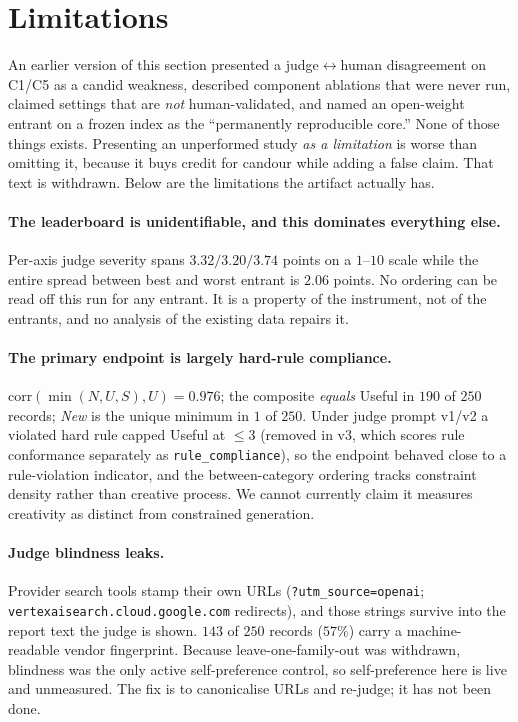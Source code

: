 \section{Limitations}
\label{sec:limitations}

An earlier version of this section presented a judge$\leftrightarrow$human disagreement on C1/C5 as a
candid weakness, described component ablations that were never run, claimed settings that are
\emph{not} human-validated, and named an open-weight entrant on a frozen index as the ``permanently
reproducible core.'' None of those things exists. Presenting an unperformed study \emph{as a limitation} is worse than omitting it, because it
buys credit for candour while adding a false claim. That text is withdrawn. Below are the limitations
the artifact actually has.

\paragraph{The leaderboard is unidentifiable, and this dominates everything else.} Per-axis judge
severity spans $3.32/3.20/3.74$ points on a $1$--$10$ scale while the entire spread between best and
worst entrant is $2.06$ points. No ordering can be read off this run for any entrant. It is a property
of the instrument, not of the entrants, and no analysis of the existing data repairs it.

\paragraph{The primary endpoint is largely hard-rule compliance.} $\mathrm{corr}(\min(N,U,S), U) =
0.976$; the composite \emph{equals} Useful in $190$ of $250$ records; \emph{New} is the unique minimum
in $1$ of $250$. Under judge prompt v1/v2 a violated hard rule capped Useful at ${\leq}3$ (removed in v3, which scores rule conformance separately as \texttt{rule\_compliance}), so the endpoint behaved close to a
rule-violation indicator, and the between-category ordering tracks constraint density rather than
creative process. We cannot currently claim it measures creativity as distinct from constrained
generation.

\paragraph{Judge blindness leaks.} Provider search tools stamp their own URLs
(\texttt{?utm\_source=openai}; \texttt{vertexaisearch.cloud.google.com} redirects), and those strings
survive into the report text the judge is shown. $143$ of $250$ records ($57\%$) carry a
machine-readable vendor fingerprint. Because leave-one-family-out was withdrawn, blindness was the
only active self-preference control, so self-preference here is live and unmeasured. The fix is to
canonicalise URLs and re-judge; it has not been done.

